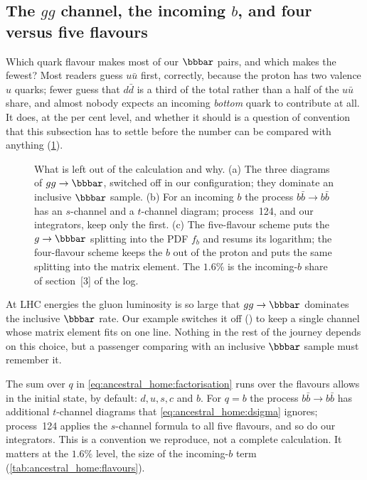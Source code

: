 \subsection{The \texorpdfstring{$gg$}{gg} channel, the incoming \texorpdfstring{$b$}{b}, and four versus five flavours}
\label{sec:ancestral_home:gg_and_flavours}

Which quark flavour makes most of our $\bbbar$ pairs, and which makes the
fewest? Most readers guess $u\bar u$ first, correctly, because the proton has
two valence $u$ quarks; fewer guess that $d\bar d$ is a third of the total
rather than a half of the $u\bar u$ share, and almost nobody expects an
incoming \emph{bottom} quark to contribute at all. It does, at the per cent
level, and whether it should is a question of convention that this
subsection has to settle before the number can be compared with anything
(\cref{fig:ancestral_home:feynman_gg}).

\begin{figure}[htbp]\centering
\resizebox{\textwidth}{!}{}
\caption[What is left out: the $gg$ channel, the $t$-channel $b\bar b$ diagram, and the two flavour schemes]{What is left out of the calculation and why. (a) The three diagrams of $gg\to\bbbar$, switched off in our configuration; they dominate an inclusive $\bbbar$ sample. (b) For an incoming $b$ the process $b\bar b\to b\bar b$ has an $s$-channel and a $t$-channel diagram; \PYTHIA process~124, and our integrators, keep only the first. (c) The five-flavour scheme puts the $g\to\bbbar$ splitting into the PDF $f_b$ and resums its logarithm; the four-flavour scheme keeps the $b$ out of the proton and puts the same splitting into the matrix element. The $1.6\%$ is the incoming-$b$ share of section~[3] of the  log.}
\label{fig:ancestral_home:feynman_gg}
\end{figure}

At LHC energies the gluon luminosity is so large that $gg\to\bbbar$ dominates
the inclusive $\bbbar$ rate. Our example switches it off
() to keep a single channel whose matrix element
fits on one line. Nothing in the rest of the journey depends on this choice,
but a passenger comparing with an inclusive $\bbbar$ sample must remember it.

The sum over $q$ in \cref{eq:ancestral_home:factorisation} runs over the
flavours \PYTHIA allows in the initial state, 
by default: $d,u,s,c$ and $b$. For $q=b$ the process $b\bar b\to b\bar b$ has
additional $t$-channel diagrams that \cref{eq:ancestral_home:dsigma} ignores;
\PYTHIA process~124 applies the $s$-channel formula to all five flavours, and
so do our integrators. This is a convention we reproduce, not a complete
calculation. It matters at the $1.6\%$ level, the size of the incoming-$b$
term (\cref{tab:ancestral_home:flavours}).

